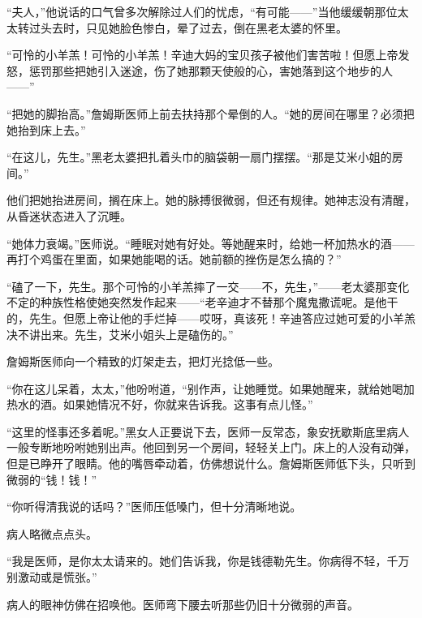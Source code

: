 \documentclass{article}
\begin{document}
“夫人，”他说话的口气曾多次解除过人们的忧虑，“有可能——”当他缓缓朝那位太太转过头去时，只见她脸色惨白，晕了过去，倒在黑老太婆的怀里。



“可怜的小羊羔！可怜的小羊羔！辛迪大妈的宝贝孩子被他们害苦啦！但愿上帝发怒，惩罚那些把她引入迷途，伤了她那颗天使般的心，害她落到这个地步的人——”



“把她的脚抬高。”詹姆斯医师上前去扶持那个晕倒的人。“她的房间在哪里？必须把她抬到床上去。”



“在这儿，先生。”黑老太婆把扎着头巾的脑袋朝一扇门摆摆。“那是艾米小姐的房间。”



他们把她抬进房间，搁在床上。她的脉搏很微弱，但还有规律。她神志没有清醒，从昏迷状态进入了沉睡。



“她体力衰竭。”医师说。“睡眠对她有好处。等她醒来时，给她一杯加热水的酒——再打个鸡蛋在里面，如果她能喝的话。她前额的挫伤是怎么搞的？”



“磕了一下，先生。那个可怜的小羊羔摔了一交——不，先生，”——老太婆那变化不定的种族性格使她突然发作起来——“老辛迪才不替那个魔鬼撒谎呢。是他干的，先生。但愿上帝让他的手烂掉——哎呀，真该死！辛迪答应过她可爱的小羊羔决不讲出来。先生，艾米小姐头上是磕伤的。”



詹姆斯医师向一个精致的灯架走去，把灯光捻低一些。



“你在这儿呆着，太太，”他吩咐道，“别作声，让她睡觉。如果她醒来，就给她喝加热水的酒。如果她情况不好，你就来告诉我。这事有点儿怪。”



“这里的怪事还多着呢。”黑女人正要说下去，医师一反常态，象安抚歇斯底里病人一般专断地吩咐她别出声。他回到另一个房间，轻轻关上门。床上的人没有动弹，但是已睁开了眼睛。他的嘴唇牵动着，仿佛想说什么。詹姆斯医师低下头，只听到微弱的“钱！钱！”



“你听得清我说的话吗？”医师压低嗓门，但十分清晰地说。



病人略微点点头。



“我是医师，是你太太请来的。她们告诉我，你是钱德勒先生。你病得不轻，千万别激动或是慌张。”



病人的眼神仿佛在招唤他。医师弯下腰去听那些仍旧十分微弱的声音。
\end{document}
